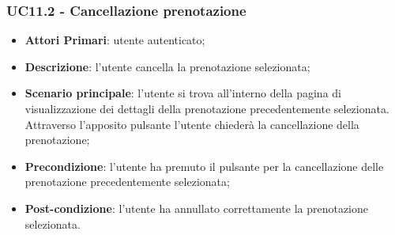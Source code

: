 \subsubsection{UC11.2 - Cancellazione prenotazione}
\begin{itemize}
	\item \textbf{Attori Primari}: utente autenticato;
	\item \textbf{Descrizione}: l'utente cancella la prenotazione selezionata;
	\item \textbf{Scenario principale}: l'utente si trova all'interno della pagina di visualizzazione dei dettagli della prenotazione precedentemente selezionata. Attraverso l'apposito pulsante l'utente chiederà la cancellazione della prenotazione;
	\item \textbf{Precondizione}: l'utente ha premuto il pulsante per la cancellazione delle prenotazione precedentemente selezionata;
	\item \textbf{Post-condizione}: l'utente ha annullato correttamente la prenotazione selezionata.
\end{itemize}

